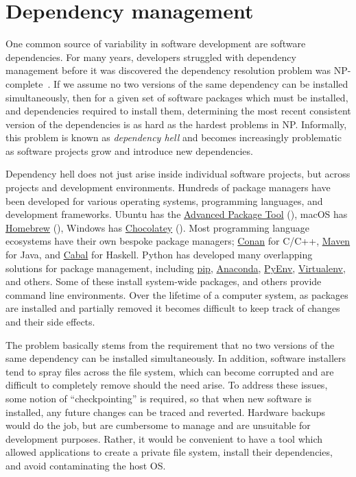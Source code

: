 \section{Dependency management}\label{sec:dependency-management}

One common source of variability in software development are software dependencies. For many years, developers struggled with dependency management before it was discovered the dependency resolution problem was NP-complete~\citep{abate2012dependency}. If we assume no two versions of the same dependency can be installed simultaneously, then for a given set of software packages which must be installed, and dependencies required to install them, determining the most recent consistent version of the dependencies is as hard as the hardest problems in NP. Informally, this problem is known as \textit{dependency hell} and becomes increasingly problematic as software projects grow and introduce new dependencies.

Dependency hell does not just arise inside individual software projects, but across projects and development environments. Hundreds of package managers have been developed for various operating systems, programming languages, and development frameworks. Ubuntu has the \href{https://help.ubuntu.com/lts/serverguide/apt.html}{Advanced Package Tool} (), macOS has \href{https://brew.sh/}{Homebrew} (), Windows has \href{https://chocolatey.org/}{Chocolatey} (). Most programming language ecosystems have their own bespoke package managers; \href{https://conan.io/}{Conan} for C/C++, \href{https://maven.apache.org}{Maven} for Java, and \href{https://www.haskell.org/cabal/}{Cabal} for Haskell. Python has developed many overlapping solutions for package management, including \href{https://pypi.org/project/pip/}{pip}, \href{https://www.anaconda.com/}{Anaconda}, \href{https://github.com/pyenv/pyenv}{PyEnv}, \href{https://virtualenv.pypa.io/}{Virtualenv}, and others. Some of these install system-wide packages, and others provide command line environments. Over the lifetime of a computer system, as packages are installed and partially removed it becomes difficult to keep track of changes and their side effects.

The problem basically stems from the requirement that no two versions of the same dependency can be installed simultaneously. In addition, software installers tend to spray files across the file system, which can become corrupted and are difficult to completely remove should the need arise. To address these issues, some notion of ``checkpointing'' is required, so that when new software is installed, any future changes can be traced and reverted. Hardware backups would do the job, but are cumbersome to manage and are unsuitable for development purposes. Rather, it would be convenient to have a tool which allowed applications to create a private file system, install their dependencies, and avoid contaminating the host OS.


